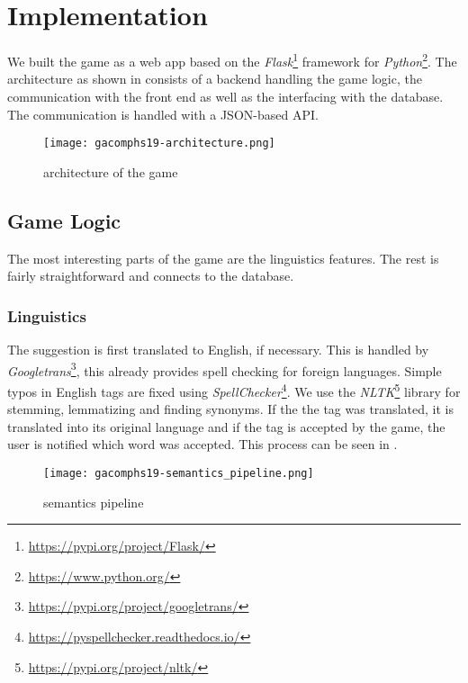 \section{Implementation}
\label{gacomphs19:sec:implementation}

We built the game as a web app based on the \textit{Flask}\footnote{\url{https://pypi.org/project/Flask/}} framework for \textit{Python}\footnote{\url{https://www.python.org/}}. The architecture as shown in  consists of a backend handling the game logic, the communication with the front end as well as the interfacing with the database. The communication is handled with a JSON-based API.

\begin{figure}[!]
	\centering
	\texttt{[image: gacomphs19-architecture.png]}
	\caption{architecture of the game}
	\label{gacomphs19:fig:architecture}
\end{figure}

\subsection{Game Logic}
\label{gacomphs19:sec:implementation:game}

The most interesting parts of the game are the linguistics features. The rest is fairly straightforward and connects to the database.

\subsubsection{Linguistics}
\label{gacomphs19:sec:implementation:linguistics}
The suggestion is first translated to English, if necessary. This is handled by \textit{Googletrans}\footnote{\url{https://pypi.org/project/googletrans/}}, this already provides spell checking for foreign languages.
Simple typos in English tags are fixed using \textit{SpellChecker}\footnote{\url{https://pyspellchecker.readthedocs.io/}}. We use the \textit{NLTK}\footnote{\url{https://pypi.org/project/nltk/}} library for stemming, lemmatizing and finding synonyms. If the the tag was translated, it is translated into its original language and if the tag is accepted by the game, the user is notified which word was accepted. This process can be seen in .

\begin{figure}[tb]
	\centering
	\texttt{[image: gacomphs19-semantics\_pipeline.png]}
	\caption{semantics pipeline}
	\label{gacomphs19:fig:semanticpipeline}
\end{figure}

